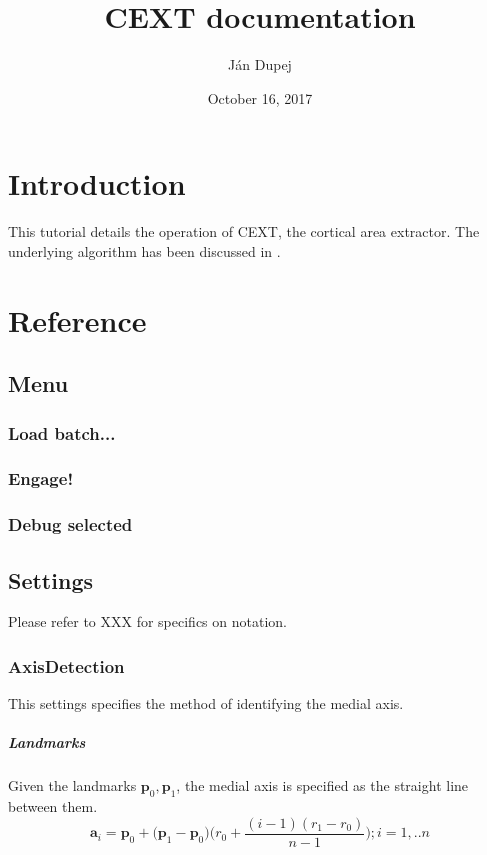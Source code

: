 \documentclass[11pt,twoside,a4paper,titlepage]{report}
\begin{document}
\title{CEXT documentation}
\author{J\'{a}n Dupej}
\date{October 16, 2017}

\maketitle
\tableofcontents

\chapter{Introduction}
This tutorial details the operation of CEXT, the cortical area extractor.
The underlying algorithm has been discussed in \cite{dupej2017}.

\chapter{Reference}

\section{Menu}
\subsection{Load batch...}
\subsection{Engage!}
\subsection{Debug selected}

\section{Settings}
Please refer to XXX for specifics on notation.
\subsection{AxisDetection}
This settings specifies the method of identifying the medial axis.
\paragraph{Landmarks} 
Given the landmarks \(\mathbf{p}_0, \mathbf{p}_1\), the medial axis is specified as the straight line between them.
\begin{equation}
\mathbf{a}_i = \mathbf{p}_0 + \big(\mathbf{p}_1 - \mathbf{p}_0\big) \bigg(r_0 + \frac{(i-1)(r_1 - r_0)}{n-1}\bigg);  i=1,..n 
\label{equ:axsDetLandm}
\end{equation}
\end{document}
